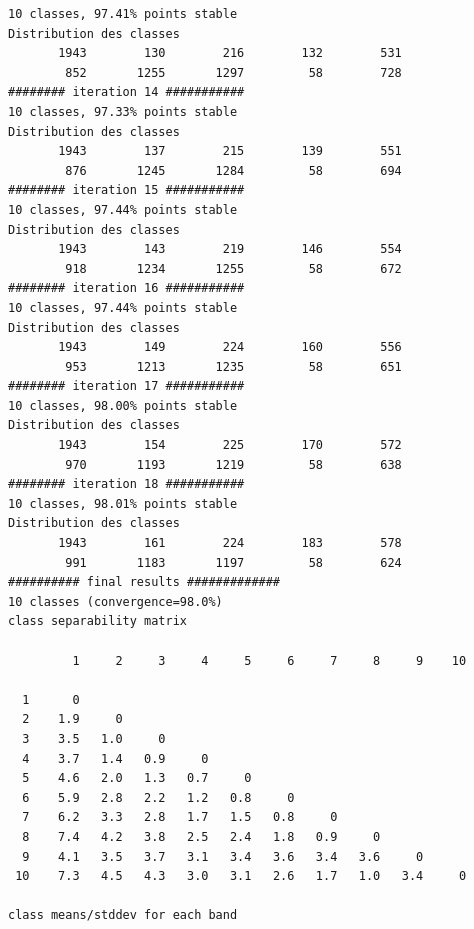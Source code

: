 \documentclass[land,article,submit,pdftex,moreauthors]{Definitions/mdpi}
\begin{document}
\begin{scriptsize}
\begin{verbatim}
10 classes, 97.41% points stable
Distribution des classes
       1943        130        216        132        531
        852       1255       1297         58        728
######## iteration 14 ###########
10 classes, 97.33% points stable
Distribution des classes
       1943        137        215        139        551
        876       1245       1284         58        694
######## iteration 15 ###########
10 classes, 97.44% points stable
Distribution des classes
       1943        143        219        146        554
        918       1234       1255         58        672
######## iteration 16 ###########
10 classes, 97.44% points stable
Distribution des classes
       1943        149        224        160        556
        953       1213       1235         58        651
######## iteration 17 ###########
10 classes, 98.00% points stable
Distribution des classes
       1943        154        225        170        572
        970       1193       1219         58        638
######## iteration 18 ###########
10 classes, 98.01% points stable
Distribution des classes
       1943        161        224        183        578
        991       1183       1197         58        624
########## final results #############
10 classes (convergence=98.0%)
class separability matrix

         1     2     3     4     5     6     7     8     9    10

  1      0
  2    1.9     0
  3    3.5   1.0     0
  4    3.7   1.4   0.9     0
  5    4.6   2.0   1.3   0.7     0
  6    5.9   2.8   2.2   1.2   0.8     0
  7    6.2   3.3   2.8   1.7   1.5   0.8     0
  8    7.4   4.2   3.8   2.5   2.4   1.8   0.9     0
  9    4.1   3.5   3.7   3.1   3.4   3.6   3.4   3.6     0
 10    7.3   4.5   4.3   3.0   3.1   2.6   1.7   1.0   3.4     0

class means/stddev for each band


\end{verbatim}
\end{scriptsize}
\end{document}

